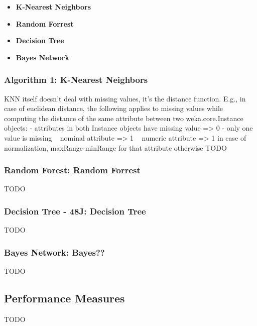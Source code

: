 \documentclass{article}
\begin{document}
\begin{itemize}
\item \textbf{K-Nearest Neighbors}
\item \textbf{Random Forrest}
\item \textbf{Decision Tree}
\item \textbf{Bayes Network}
\end{itemize}


\subsubsection{Algorithm 1: K-Nearest Neighbors}
KNN itself doesn't deal with missing values, it's the distance 
function. E.g., in case of euclidean distance, the following applies 
to missing values while computing the distance of the same attribute 
between two weka.core.Instance objects: 
- attributes in both Instance objects have missing value 
  => 0 
- only one value is missing 
  ~ nominal attribute 
    => 1 
  ~ numeric attribute 
    => 1 in case of normalization, maxRange-minRange for that 
attribute otherwise 
TODO\\
\subsubsection{Random Forest: Random Forrest}
TODO\\
\subsubsection{Decision Tree - 48J: Decision Tree}
TODO\\
\subsubsection{Bayes Network: Bayes??}
TODO\\

\subsection{Performance Measures}
TODO\\

\end{document}
